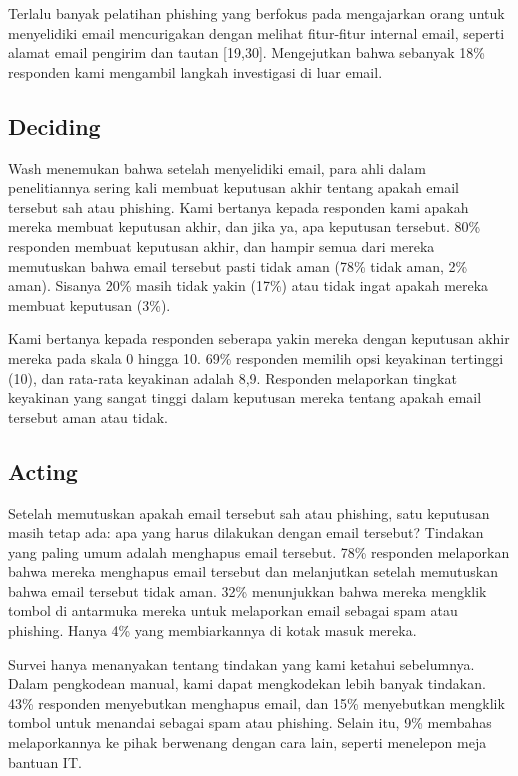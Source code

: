 \documentclass[lettersize,journal]{IEEEtran}
\begin{document}
Terlalu banyak pelatihan phishing yang berfokus pada mengajarkan orang untuk
menyelidiki email mencurigakan dengan melihat fitur-fitur internal email,
seperti alamat email pengirim dan tautan [19,30]. Mengejutkan bahwa sebanyak
18\% responden kami mengambil langkah investigasi di luar email.

\subsection{Deciding}

Wash \cite{tigaempat} menemukan bahwa setelah menyelidiki email, para ahli
dalam penelitiannya sering kali membuat keputusan akhir tentang apakah email
tersebut sah atau phishing. Kami bertanya kepada responden kami apakah mereka
membuat keputusan akhir, dan jika ya, apa keputusan tersebut. 80\% responden
membuat keputusan akhir, dan hampir semua dari mereka memutuskan bahwa email
tersebut pasti tidak aman (78\% tidak aman, 2\% aman). Sisanya 20\% masih tidak
yakin (17\%) atau tidak ingat apakah mereka membuat keputusan (3\%).

Kami bertanya kepada responden seberapa yakin mereka dengan keputusan akhir
mereka pada skala 0 hingga 10. 69\% responden memilih opsi keyakinan tertinggi
(10), dan rata-rata keyakinan adalah 8,9. Responden melaporkan tingkat
keyakinan yang sangat tinggi dalam keputusan mereka tentang apakah email
tersebut aman atau tidak.

\subsection{Acting}

Setelah memutuskan apakah email tersebut sah atau phishing, satu keputusan
masih tetap ada: apa yang harus dilakukan dengan email tersebut? Tindakan yang
paling umum adalah menghapus email tersebut. 78\% responden melaporkan bahwa
mereka menghapus email tersebut dan melanjutkan setelah memutuskan bahwa email
tersebut tidak aman. 32\% menunjukkan bahwa mereka mengklik tombol di antarmuka
mereka untuk melaporkan email sebagai spam atau phishing. Hanya 4\% yang
membiarkannya di kotak masuk mereka.

Survei hanya menanyakan tentang tindakan yang kami ketahui sebelumnya. Dalam
pengkodean manual, kami dapat mengkodekan lebih banyak tindakan. 43\% responden
menyebutkan menghapus email, dan 15\% menyebutkan mengklik tombol untuk
menandai sebagai spam atau phishing. Selain itu, 9\% membahas melaporkannya ke
pihak berwenang dengan cara lain, seperti menelepon meja bantuan IT.
\end{document}
